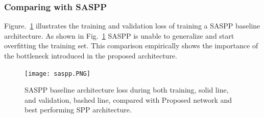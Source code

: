 \subsubsection{Comparing with SASPP}
Figure.~\ref{saspp} illustrates the training and validation loss of training a SASPP baseline architecture. As shown in Fig.~\ref{saspp} SASPP is unable to generalize and start overfitting the training set. This comparison empirically shows the importance of the bottleneck introduced in the proposed architecture.

\begin{center}
\begin{figure}[htbp]
\centerline{\texttt{[image: saspp.PNG]}}
\caption{SASPP baseline architecture loss during both training, solid line, and validation, bashed line, compared with Proposed network and best performing SPP architecture.}
\label{saspp}
\end{figure}
\end{center}

